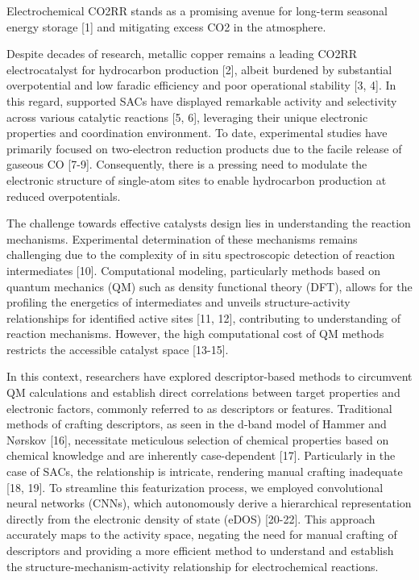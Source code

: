 Electrochemical CO2RR stands as a promising avenue for long-term seasonal energy storage [1] and mitigating excess CO2 in the atmosphere.

Despite decades of research, metallic copper remains a leading CO2RR electrocatalyst for hydrocarbon production [2], albeit burdened by substantial overpotential and low faradic efficiency and poor operational stability [3, 4]. In this regard, supported SACs have displayed remarkable activity and selectivity across various catalytic reactions [5, 6], leveraging their unique electronic properties and coordination environment. To date, experimental studies have primarily focused on two-electron reduction products due to the facile release of gaseous CO [7-9]. Consequently, there is a pressing need to modulate the electronic structure of single-atom sites to enable hydrocarbon production at reduced overpotentials.

The challenge towards effective catalysts design lies in understanding the reaction mechanisms. Experimental determination of these mechanisms remains challenging due to the complexity of in situ spectroscopic detection of reaction intermediates [10]. Computational modeling, particularly methods based on quantum mechanics (QM) such as density functional theory (DFT), allows for the profiling the energetics of intermediates and unveils structure-activity relationships for identified active sites [11, 12], contributing to understanding of reaction mechanisms. However, the high computational cost of QM methods restricts the accessible catalyst space [13-15].

In this context, researchers have explored descriptor-based methods to circumvent QM calculations and establish direct correlations between target properties and electronic factors, commonly referred to as descriptors or features. Traditional methods of crafting descriptors, as seen in the d-band model of Hammer and Nørskov [16], necessitate meticulous selection of chemical properties based on chemical knowledge and are inherently case-dependent [17]. Particularly in the case of SACs, the relationship is intricate, rendering manual crafting inadequate [18, 19]. To streamline this featurization process, we employed convolutional neural networks (CNNs), which autonomously derive a hierarchical representation directly from the electronic density of state (eDOS) [20-22]. This approach accurately maps to the activity space, negating the need for manual crafting of descriptors and providing a more efficient method to understand and establish the structure-mechanism-activity relationship for electrochemical reactions.

